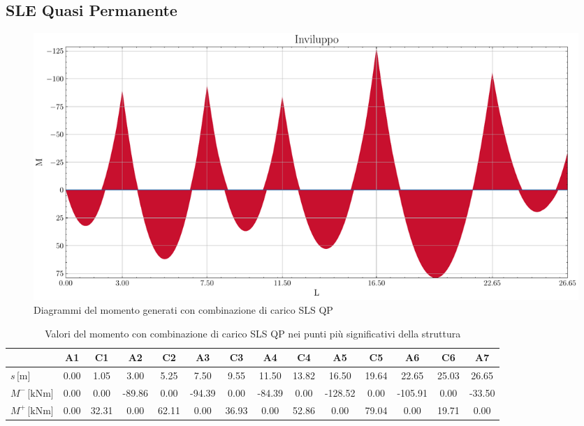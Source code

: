 \begin{landscape}
\subsection{SLE Quasi Permanente}
\begin{figure}[H]
\centering
\includegraphics[height=0.6\textwidth]{IMG/diagrammi_trave/SLS_QP_M.pdf}
\caption{Diagrammi del momento generati con combinazione di carico SLS QP}
\label{fig:trave_SLS_QP_momento}
\end{figure}
\begin{table}[H]
\footnotesize
\centering
\caption{Valori del momento con combinazione di carico SLS QP nei punti più significativi della struttura}
\label{tab:trave_SLS_QP_momento}
	\begin{tabular}{lS[table-format=-3.2]S[table-format=-3.2]S[table-format=-3.2]S[table-format=-3.2]S[table-format=-3.2]S[table-format=-3.2]S[table-format=-3.2]S[table-format=-3.2]S[table-format=-3.2]S[table-format=-3.2]S[table-format=-3.2]S[table-format=-3.2]S[table-format=-3.2]}
		\toprule
		{} & {A1} & {C1} & {A2} & {C2} & {A3} & {C3} & {A4} & {C4} & {A5} & {C5} & {A6} & {C6} & {A7} \\
		\midrule
		$s\,\si{[\metre]}$ & 0.00 & 1.05 & 3.00 & 5.25 & 7.50 & 9.55 & 11.50 & 13.82 & 16.50 & 19.64 & 22.65 & 25.03 & 26.65 \\
        $M^{-}\,\si{[\kilo\newton\metre]}$ & 0.00 & 0.00 & -89.86 & 0.00 & -94.39 & 0.00 & -84.39 & 0.00 & -128.52 & 0.00 & -105.91 & 0.00 & -33.50 \\
        $M^{+}\,\si{[\kilo\newton\metre]}$ & 0.00 & 32.31 & 0.00 & 62.11 & 0.00 & 36.93 & 0.00 & 52.86 & 0.00 & 79.04 & 0.00 & 19.71 & 0.00 \\
		\bottomrule
	\end{tabular}
\end{table}

\end{landscape}

